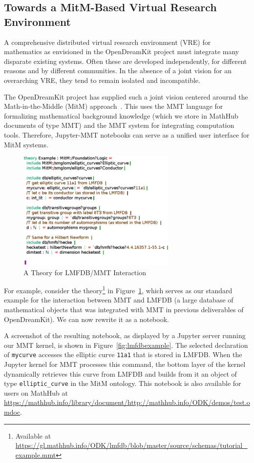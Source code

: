 \subsection{Towards a MitM-Based Virtual Research Environment}


A comprehensive distributed virtual research environment (VRE) for mathematics as envisioned in the OpenDreamKit project must integrate many disparate existing systems.
Often these are developed independently, for different reasons and by different communities.
In the absence of a joint vision for an overarching VRE, they tend to remain isolated and incompatible.

The OpenDreamKit project has supplied such a joint vision centered arournd the Math-in-the-Middle (MitM) approach~\cite{DehKohKon:iop16}.
This uses the MMT language for formalizing mathematical background knowledge (which we store in MathHub documents of type MMT) and the MMT system for integrating computation tools.
Therefore, Jupyter-MMT notebooks can serve as a unified user interface for MitM systems.

\begin{figure}[ht]\centering
  \includegraphics[width=0.7\textwidth]{../D4.11/hecke}
  \caption{A Theory for LMFDB/MMT Interaction}\label{fig:hecke}
\end{figure}

For example, consider the theory\footnote{Available at \url{https://gl.mathhub.info/ODK/lmfdb/blob/master/source/schemas/tutorial_example.mmt}}  in Figure~\ref{fig:hecke}, which serves as our standard example for the interaction between MMT and LMFDB (a large database of mathematical objects that was integrated with MMT in previous deliverables of OpenDreamKit).
We can now rewrite it as a notebook.

A screenshot of the resulting notebook, as displayed by a Jupyter server running our MMT kernel, is shown in Figure~\ref{fig:lmfdbexample}.
The selected declaration of \texttt{mycurve} accesses the elliptic curve \texttt{11a1} that is stored in LMFDB.
When the Jupyter kernel for MMT processes this command, the bottom layer of the kernel dynamically retrieves this curve from LMFDB and builds from it an object of type \texttt{elliptic\_curve} in the MitM ontology.
This notebook is also available for users on MathHub at \url{https://mathhub.info/library/document/http://mathhub.info/ODK/demos/test.omdoc}. 

